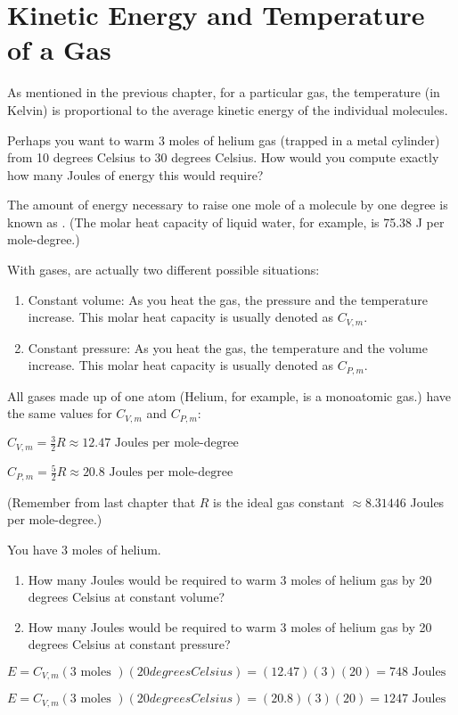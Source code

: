 \chapter{Kinetic Energy and Temperature of a Gas}

As mentioned in the previous chapter,   for a particular gas,  the temperature (in Kelvin) is proportional to the average kinetic energy of the individual molecules. 

Perhaps you want to warm 3 moles of helium gas (trapped in a metal cylinder) from 10 degrees Celsius to 30 degrees Celsius.   
How would you compute exactly how many Joules of energy this would require?

The amount of energy necessary to raise one mole of a molecule by one degree is known as .  
(The molar heat capacity of liquid water, for example, is 75.38 J per mole-degree.)

With gases, are actually two different possible situations:
\begin{enumerate}
\item Constant volume: As you heat the gas,  the pressure and the temperature increase.  This molar heat capacity is usually denoted as $C_{V,m}$.
\item Constant pressure: As you heat the gas,  the temperature and the volume increase.  This molar heat capacity  is usually denoted as $C_{P, m}$.
\end{enumerate}

All gases made up of one atom (Helium, for example, is a monoatomic gas.) have the same values for $C_{V,m}$ and $C_{P,m}$:

$C_{V,m} = \frac{3}{2}R \approx 12.47 \text{ Joules per mole-degree}$

$C_{P,m} = \frac{5}{2}R \approx 20.8  \text{ Joules per mole-degree}$

(Remember from last chapter that $R$ is the ideal gas constant $\approx 8.31446$ Joules per mole-degree.)

\begin{Exercise}[title={Warming Helium},  label=warming_helium]

You have 3 moles of helium.  
  
\begin{enumerate}

\item How many Joules would be required to warm 3 moles of helium gas by 20 degrees Celsius at constant volume?  

\item How many Joules would be required to warm 3 moles of helium gas by 20 degrees Celsius at constant pressure?  

\end{enumerate}


\end{Exercise}
\begin{Answer}[ref=warming_helium]

$E = C_{V,m} (3 \text{ moles }) (20 { degrees Celsius }) = (12.47)(3)(20) = 748 \text{ Joules }$

$E = C_{V,m} (3 \text{ moles }) (20 { degrees Celsius }) = (20.8)(3)(20) = 1247 \text{ Joules }$
\end{Answer}

